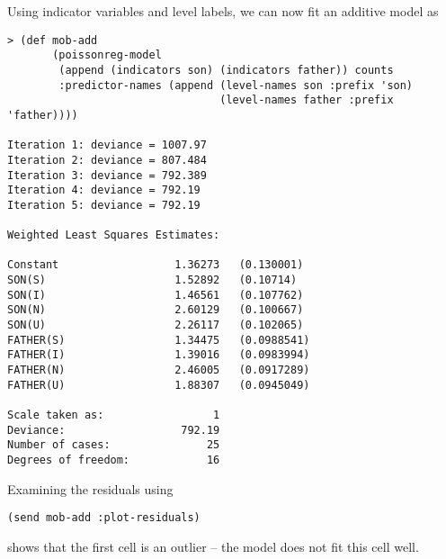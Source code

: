 Using indicator variables and level labels, we can now fit an additive
model as
\begin{verbatim}
> (def mob-add
       (poissonreg-model
        (append (indicators son) (indicators father)) counts
        :predictor-names (append (level-names son :prefix 'son)
                                 (level-names father :prefix 'father))))

Iteration 1: deviance = 1007.97
Iteration 2: deviance = 807.484
Iteration 3: deviance = 792.389
Iteration 4: deviance = 792.19
Iteration 5: deviance = 792.19

Weighted Least Squares Estimates:

Constant                  1.36273   (0.130001)
SON(S)                    1.52892   (0.10714)
SON(I)                    1.46561   (0.107762)
SON(N)                    2.60129   (0.100667)
SON(U)                    2.26117   (0.102065)
FATHER(S)                 1.34475   (0.0988541)
FATHER(I)                 1.39016   (0.0983994)
FATHER(N)                 2.46005   (0.0917289)
FATHER(U)                 1.88307   (0.0945049)

Scale taken as:                 1
Deviance:                  792.19
Number of cases:               25
Degrees of freedom:            16
\end{verbatim}
Examining the residuals using  
\begin{verbatim}
(send mob-add :plot-residuals)
\end{verbatim}
shows that the first cell is an outlier -- the model does not fit this
cell well.

